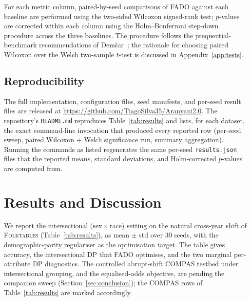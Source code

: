 \documentclass[sigconf,anonymous,review]{acmart}
\begin{document}
For each metric column, paired-by-seed comparisons of \textsc{FADO} against each baseline are performed using the two-sided Wilcoxon signed-rank test;
$p$-values are corrected within each column using the Holm--Bonferroni step-down procedure across the three baselines. The procedure follows the
prequential-benchmark recommendations of Dem{\v{s}}ar~\cite{demsar2006statistical}; the rationale for choosing paired Wilcoxon over the Welch
two-sample $t$-test is discussed in Appendix~\ref{app:tests}.

\subsection{Reproducibility}
\label{sec:method:reproducibility}
The full implementation, configuration files, seed manifests, and per-seed result files are released at
\url{https://github.com/TiagoSilva35/Aranyani2.0}. The repository's \texttt{README.md} reproduces Table~\ref{tab:results} and lists, for each dataset, the
exact command-line invocation that produced every reported row (per-seed sweep, paired Wilcoxon + Welch significance run, summary aggregation). Running the
commands as listed regenerates the same per-seed \texttt{results.json} files that the reported means, standard deviations, and Holm-corrected $p$-values
are computed from.

\section{Results and Discussion}
\label{sec:results}
We report the intersectional (sex\,$\times$\,race) setting on the natural cross-year shift of \textsc{Folktables} (Table~\ref{tab:results}), as mean $\pm$ std
over $30$ seeds, with the demographic-parity regulariser as the optimisation target. The table gives accuracy, the intersectional DP that \textsc{FADO}
optimises, and the two marginal per-attribute DP diagnostics. The controlled abrupt-shift \textsc{COMPAS} testbed under intersectional grouping, and the
equalised-odds objective, are pending the companion sweep (Section~\ref{sec:conclusion}); the \textsc{COMPAS} rows of Table~\ref{tab:results} are marked
accordingly.
\end{document}
